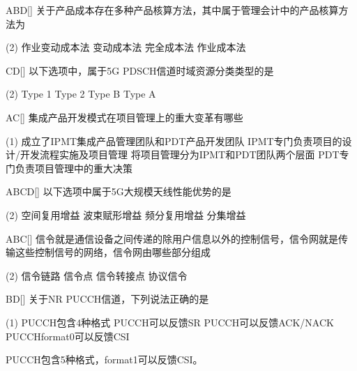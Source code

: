 \begin{choice}{\;ABD\;}[]
    关于产品成本存在多种产品核算方法，其中属于管理会计中的产品核算方法为
    \begin{tasks}(2)
        \task 作业变动成本法
        \task 变动成本法
        \task 完全成本法
        \task 作业成本法
    \end{tasks}
\end{choice}

\begin{choice}{\;CD\;}[]
    以下选项中，属于5G PDSCH信道时域资源分类类型的是
    \begin{tasks}(2)
        \task Type 1
        \task Type 2
        \task Type B
        \task Type A
    \end{tasks}
\end{choice}

\begin{choice}{\;AC\;}[]
    集成产品开发模式在项目管理上的重大变革有哪些
    \begin{tasks}(1)
        \task 成立了IPMT集成产品管理团队和PDT产品开发团队
        \task IPMT专门负责项目的设计/开发流程实施及项目管理
        \task 将项目管理分为IPMT和PDT团队两个层面
        \task PDT专门负责项目管理中的重大决策
    \end{tasks}
\end{choice}


\begin{choice}{\;ABCD\;}[]
    以下选项中属于5G大规模天线性能优势的是
    \begin{tasks}(2)
        \task 空间复用增益
        \task 波束赋形增益
        \task 频分复用增益
        \task 分集增益
    \end{tasks}
\end{choice}


\begin{choice}{\;ABC\;}[]
    信令就是通信设备之间传递的除用户信息以外的控制信号，信令网就是传输这些控制信号的网络，信令网由哪些部分组成
    \begin{tasks}(2)
        \task 信令链路
        \task 信令点
        \task 信令转接点
        \task 协议信令
    \end{tasks}
\end{choice}


\begin{choice}{\;BD\;}[]
    关于NR PUCCH信道，下列说法正确的是
    \begin{tasks}(1)
        \task PUCCH包含4种格式
        \task PUCCH可以反馈SR
        \task PUCCH可以反馈ACK/NACK
        \task PUCCHformat0可以反馈CSI
    \end{tasks}
\end{choice}
\begin{solution}
    PUCCH包含5种格式，format1可以反馈CSI。
\end{solution}


